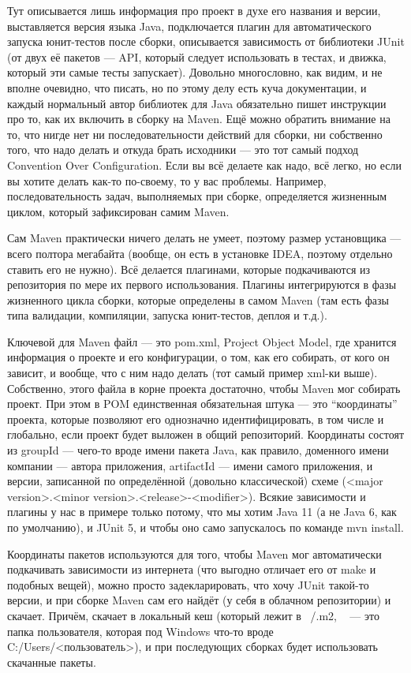 \documentclass[a5paper]{article}
\begin{document}
Тут описывается лишь информация про проект в духе его названия и версии, выставляется версия языка Java, подключается плагин для автоматического запуска юнит-тестов после сборки, описывается зависимость от библиотеки JUnit (от двух её пакетов --- API, который следует использовать в тестах, и движка, который эти самые тесты запускает). Довольно многословно, как видим, и не вполне очевидно, что писать, но по этому делу есть куча документации, и каждый нормальный автор библиотек для Java обязательно пишет инструкции про то, как их включить в сборку на Maven. Ещё можно обратить внимание на то, что нигде нет ни последовательности действий для сборки, ни собственно того, что надо делать и откуда брать исходники --- это тот самый подход Convention Over Configuration. Если вы всё делаете как надо, всё легко, но если вы хотите делать как-то по-своему, то у вас проблемы. Например, последовательность задач, выполняемых при сборке, определяется жизненным циклом, который зафиксирован самим Maven.

Сам Maven практически ничего делать не умеет, поэтому размер установщика --- всего полтора мегабайта (вообще, он есть в установке IDEA, поэтому отдельно ставить его не нужно). Всё делается плагинами, которые подкачиваются из репозитория по мере их первого использования. Плагины интегрируются в фазы жизненного цикла сборки, которые определены в самом Maven (там есть фазы типа валидации, компиляции, запуска юнит-тестов, деплоя и т.д.). 

Ключевой для Maven файл --- это pom.xml, Project Object Model, где хранится информация о проекте и его конфигурации, о том, как его собирать, от кого он зависит, и вообще, что с ним надо делать (тот самый пример xml-ки выше). Собственно, этого файла в корне проекта достаточно, чтобы Maven мог собирать проект. При этом в POM единственная обязательная штука --- это ``координаты'' проекта, которые позволяют его однозначно идентифицировать, в том числе и глобально, если проект будет выложен в общий репозиторий. Координаты состоят из groupId --- чего-то вроде имени пакета Java, как правило, доменного имени компании --- автора приложения, artifactId --- имени самого приложения, и версии, записанной по определённой (довольно классической) схеме (<major version>.<minor version>.<release>-<modifier>). Всякие зависимости и плагины у нас в примере только потому, что мы хотим Java 11 (а не Java 6, как по умолчанию), и JUnit 5, и чтобы оно само запускалось по команде mvn install.

Координаты пакетов используются для того, чтобы Maven мог автоматически подкачивать зависимости из интернета (что выгодно отличает его от make и подобных вещей), можно просто задекларировать, что хочу JUnit такой-то версии, и при сборке Maven сам его найдёт (у себя в облачном репозитории) и скачает. Причём, скачает в локальный кеш (который лежит в ~/.m2, ~ --- это папка пользователя, которая под Windows что-то вроде  C:/Users/<пользователь>), и при последующих сборках будет использовать скачанные пакеты.
\end{document}
